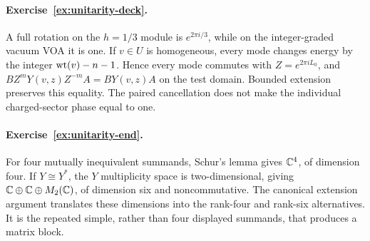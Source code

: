 \paragraph{Exercise~\ref{ex:unitarity-deck}.}
\label{sol:ex:unitarity-deck}
A full rotation on the $h=1/3$ module is
$e^{2\pi i/3}$, while on the integer-graded vacuum VOA it is
one. If $v\in U$ is homogeneous, every mode changes energy
by the integer $\operatorname{wt}(v)-n-1$. Hence every mode commutes
with $Z=e^{2\pi iL_0}$, and
$BZ^mY(v,z)Z^{-m}A=BY(v,z)A$ on the test domain.
Bounded extension preserves this equality. The paired
cancellation does not make the individual charged-sector
phase equal to one.



\paragraph{Exercise~\ref{ex:unitarity-end}.}
\label{sol:ex:unitarity-end}
For four mutually inequivalent summands, Schur's lemma gives
$\mathbb C^4$, of dimension four. If $Y\cong Y^*$, the $Y$
multiplicity space is two-dimensional, giving
$\mathbb C\oplus\mathbb C\oplus M_2(\mathbb C)$, of dimension six and
noncommutative. The canonical extension argument translates
these dimensions into the rank-four and rank-six alternatives.
It is the repeated simple, rather than four displayed summands,
that produces a matrix block.



